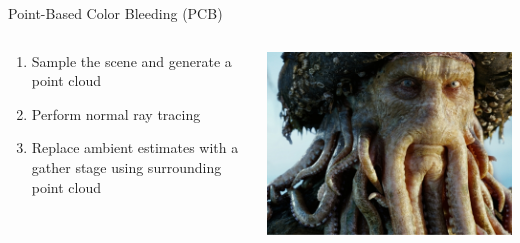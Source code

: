 \documentclass[10pt,compress,professionalfont]{beamer}
\begin{document}
\begin{frame}{Point-Based Color Bleeding (PCB)}

    \begin{columns}
        \begin{column}{0.6\textwidth}
            \begin{enumerate}
                \item Sample the scene and generate a point cloud
                \item Perform normal ray tracing
                \item Replace ambient estimates with a gather stage using surrounding point cloud
            \end{enumerate}
        \end{column}
        \begin{column}{0.4\textwidth}
            {\centering
                \includegraphics[width=\textwidth]{../img/external/davyjones}\\
            }
        \end{column}
    \end{columns}
\end{frame}
\end{document}
